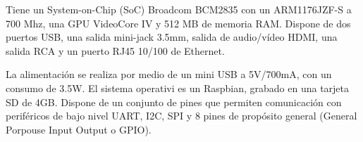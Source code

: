 \documentclass[twoside,11pt]{report}
\begin{document}

Tiene un System-on-Chip (SoC) Broadcom BCM2835 con un ARM1176JZF-S a 700 Mhz, una GPU VideoCore IV y 512 MB de memoria RAM. Dispone de dos puertos USB, una salida mini-jack 3.5mm, salida de audio/vídeo HDMI, una salida RCA y un puerto  RJ45 10/100 de Ethernet. 

La alimentación se realiza por medio de un mini USB a 5V/700mA, con un consumo de 3.5W. El sistema operativi es un Raspbian, grabado en una tarjeta SD de 4GB. Dispone de un conjunto de pines que permiten comunicación con periféricos de bajo nivel UART, I2C, SPI y 8 pines de propósito general (General Porpouse Input Output o GPIO).
\end{document}
